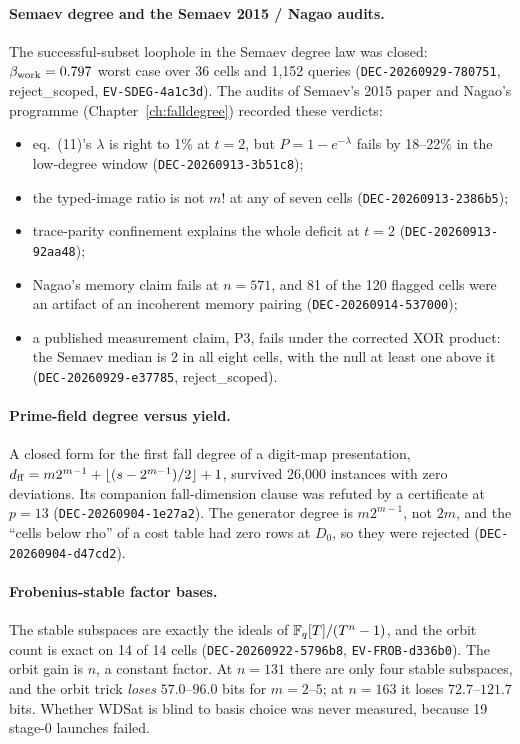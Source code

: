 \paragraph{Semaev degree and the Semaev 2015 / Nagao audits.} The
successful-subset loophole in the Semaev degree law was closed:
$\beta_{\rm work}=0.797$ worst case over 36 cells and 1{,}152 queries
(\texttt{DEC-20260929-780751}, reject\_scoped, \texttt{EV-SDEG-4a1c3d}).
The audits of Semaev's 2015 paper and Nagao's programme
(Chapter~\ref{ch:falldegree}) recorded these verdicts:
\begin{itemize}
\item eq.~(11)'s $\lambda$ is right to 1\% at $t=2$, but $P=1-e^{-\lambda}$
  fails by 18--22\% in the low-degree window (\texttt{DEC-20260913-3b51c8});
\item the typed-image ratio is not $m!$ at any of seven cells
  (\texttt{DEC-20260913-2386b5});
\item trace-parity confinement explains the whole deficit at $t=2$
  (\texttt{DEC-20260913-92aa48});
\item Nagao's memory claim fails at $n=571$, and 81 of the 120 flagged
  cells were an artifact of an incoherent memory pairing
  (\texttt{DEC-20260914-537000});
\item a published measurement claim, P3, fails under the corrected XOR
  product: the Semaev median is 2 in all eight cells, with the null at
  least one above it (\texttt{DEC-20260929-e37785}, reject\_scoped).
\end{itemize}

\paragraph{Prime-field degree versus yield.} A closed form for the first
fall degree of a digit-map presentation,
$d_{\rm ff}=m2^{m-1}+\lfloor(s-2^{m-1})/2\rfloor+1$, survived 26{,}000
instances with zero deviations. Its companion fall-dimension clause was
refuted by a certificate at $p=13$ (\texttt{DEC-20260904-1e27a2}). The
generator degree is $m2^{m-1}$, not $2m$, and the ``cells below rho'' of a
cost table had zero rows at $D_0$, so they were rejected
(\texttt{DEC-20260904-d47cd2}).

\paragraph{Frobenius-stable factor bases.} The stable subspaces are
exactly the ideals of $\mathbb{F}_q[T]/(T^n-1)$, and the orbit count is exact on
14 of 14 cells (\texttt{DEC-20260922-5796b8},
\texttt{EV-FROB-d336b0}). The orbit gain is $n$, a constant factor. At
$n=131$ there are only four stable subspaces, and the orbit trick
\emph{loses} $57.0$--$96.0$ bits for $m=2$--$5$; at $n=163$ it loses
$72.7$--$121.7$ bits. Whether WDSat is blind to basis choice was never
measured, because 19 stage-0 launches failed.

